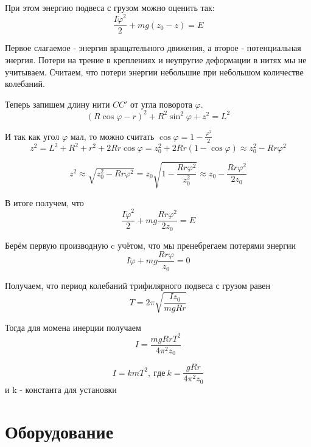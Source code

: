 \documentclass[12pt,a4paper]{article}
\begin{document}
При этом энергию подвеса с грузом можно оценить так:
\begin{equation}
    \frac{I\dot{\varphi}^2}{2}+mg(z_0-z)=E
\end{equation}

Первое слагаемое - энергия вращательного движения, а второе - потенциальная энергия. Потери на трение в креплениях и неупругие деформации в нитях мы не учитываем. Считаем, что потери энергии небольшие при небольшом количестве колебаний.

Теперь запишем длину нити $CC'$ от угла поворота $\varphi$. 
\begin{equation}
    (R\cos{\varphi}-r)^2+R^2\sin^2{\varphi}+z^2=L^2
\end{equation}

И так как угол $\varphi$ мал, то можно считать $\cos{\varphi}=1-\frac{\varphi^2}{2}$
\begin{equation}
    z^2=L^2+R^2+r^2+2Rr\cos{\varphi}=z^2_0+2Rr(1-\cos{\varphi})\approx
    z^2_0-Rr\varphi^2
\end{equation}

\begin{equation}
    z^2\approx \sqrt{z^2_0-Rr\varphi^2}=z_0\sqrt{1-\frac{Rr\varphi^2}{z_0^2}} \approx z_0-\frac{Rr\varphi^2}{2z_0}
\end{equation}

В итоге получем, что 
\begin{equation}
    \frac{I\dot{\varphi}^2}{2}+mg\frac{Rr\varphi^2}{2z_0}=E
\end{equation}

Берём первую производную c учётом, что мы пренебрегаем потерями энергии
\begin{equation}
    I\ddot{\varphi}+mg\frac{Rr\varphi}{z_0}=0
\end{equation}

Получаем, что период колебаний трифилярного подвеса с грузом равен
\begin{equation}
   T=2\pi\sqrt{\frac{Iz_0}{mgRr}}
\end{equation}

Тогда для момена инерции получаем
\begin{equation}
   I=\frac{mgRrT^2}{4\pi^2z_0}
\end{equation}

\begin{equation}
   I=kmT^2,~где~k=\frac{gRr}{4\pi^2z_0}
\end{equation}
 и k - константа для установки

\section{ Оборудование}
\end{document}
